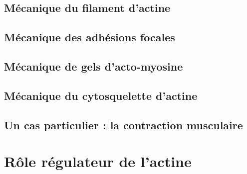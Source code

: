 \documentclass{report}
\begin{document}
\subsection{Mécanique du filament d'actine}

\subsection{Mécanique des adhésions focales}

\subsection{Mécanique de gels d'acto-myosine}

\subsection{Mécanique du cytosquelette d'actine}

\subsection{Un cas particulier : la contraction musculaire}

\section{Rôle régulateur de l'actine}
\end{document}
